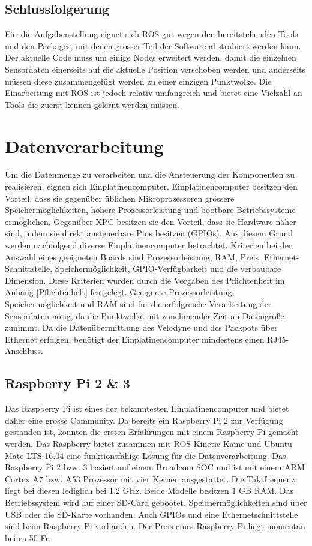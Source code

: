 \subsection{Schlussfolgerung}
Für die Aufgabenstellung eignet sich ROS gut wegen den bereitstehenden Tools und den Packages, mit denen grosser Teil der Software abstrahiert werden kann. Der aktuelle Code muss um einige Nodes erweitert werden, damit die einzelnen Sensordaten einerseits auf die aktuelle Position verschoben werden und anderseits müssen diese zusammengefügt werden zu einer einzigen Punktwolke. Die Einarbeitung mit ROS ist jedoch relativ umfangreich und bietet eine Vielzahl an Tools die zuerst kennen gelernt werden müssen.  

\section{Datenverarbeitung}
\label{sec:Datenverarbeitung}
Um die Datenmenge zu verarbeiten und die Ansteuerung der Komponenten zu realisieren, eignen sich Einplatinencomputer. Einplatinencomputer besitzen den Vorteil, dass sie gegenüber üblichen Mikroprozessoren grössere Speichermöglichkeiten, höhere Prozessorleistung und bootbare Betriebssysteme ermöglichen. Gegenüber \ac{XPC} besitzen sie den Vorteil, dass sie Hardware näher sind, indem sie direkt ansteuerbare Pins besitzen (GPIOs). Aus diesem Grund werden nachfolgend diverse Einplatinencomputer betrachtet. Kriterien bei der Auswahl eines geeigneten Boards sind Prozessorleistung, \ac{RAM}, Preis, Ethernet-Schnittstelle, Speichermöglichkeit, GPIO-Verfügbarkeit und die verbaubare Dimension. Diese Kriterien wurden durch die Vorgaben des Pflichtenheft im Anhang \ref{Pflichtenheft} festgelegt. Geeignete Prozessorleistung, Speichermöglichkeit und \ac{RAM} sind für die erfolgreiche Verarbeitung der Sensordaten nötig, da die Punktwolke mit zunehmender Zeit an Datengröße zunimmt. Da die Datenübermittlung des Velodyne und des Packpots über Ethernet erfolgen, benötigt der Einplatinencomputer mindestens einen RJ45-Anschluss.

\subsection{Raspberry Pi 2 \& 3}
\label{subsec:Raspberry}
Das Raspberry Pi ist eines der bekanntesten Einplatinencomputer und bietet daher eine grosse Community. Da bereits ein Raspberry Pi 2 zur Verfügung gestanden ist, konnten die ersten Erfahrungen mit einem Raspberry Pi gemacht werden. Das Raspberry bietet zusammen mit ROS Kinetic Kame und Ubuntu Mate LTS 16.04 eine funktionsfähige Lösung für die Datenverarbeitung. Das Raspberry Pi 2 bzw. 3 basiert auf einem Broadcom \ac{SOC} und ist mit einem \ac{ARM} Cortex A7 bzw. A53 Prozessor mit vier Kernen ausgestattet. Die Taktfrequenz liegt bei diesen lediglich bei 1.2 GHz. Beide Modelle besitzen 1 GB \ac{RAM}. Das Betriebssystem wird auf einer \ac{SD}-Card gebootet. Speichermöglichkeiten sind über USB oder die SD-Karte vorhanden. Auch GPIOs und eine Ethernetschnittstelle sind beim Raspberry Pi vorhanden. Der Preis eines Raspberry Pi liegt momentan bei ca 50 Fr. \cite{rpi}

